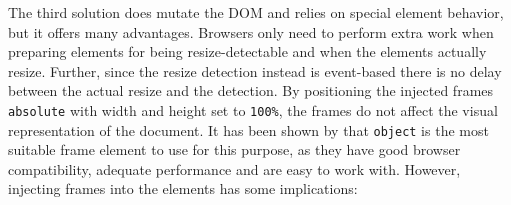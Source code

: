 \documentclass[a4paper,11pt]{kth-mag}
\newcommand{\code}[1]{\texttt{#1}}
\begin{document}
          The third solution does mutate the \gls{DOM} and relies on special \gls{element} behavior, but it offers many advantages.
          Browsers only need to perform extra work when preparing \glspl{element} for being resize-detectable and when the \glspl{element} actually resize.
          Further, since the resize detection instead is event-based there is no delay between the actual resize and the detection.
          By positioning the injected frames \code{absolute} with width and height set to \code{100\%}, the frames do not affect the visual representation of the \gls{document}.
          It has been shown by \cite{backalley} that \code{object} is the most suitable frame \gls{element} to use for this purpose, as they have good \gls{browser} compatibility, adequate performance and are easy to work with.
          However, injecting frames into the \glspl{element} has some implications:
\end{document}
